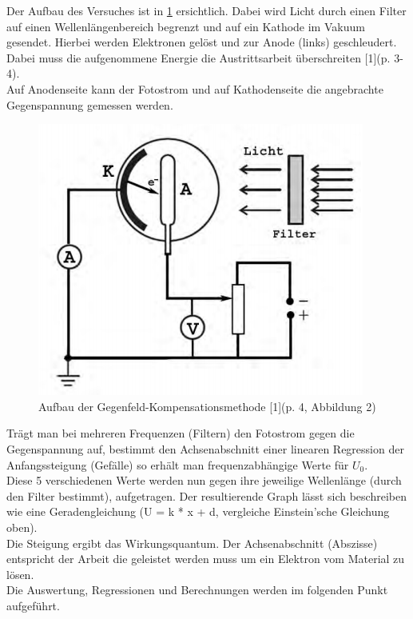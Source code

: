 \documentclass[12pt,a4paper]{article}
\begin{document}
\begin{multicols}{2}
\noindent 
Der Aufbau des Versuches ist in \ref{fig:Plank_Aufbau} ersichtlich. Dabei wird Licht durch einen Filter auf einen Wellenlängenbereich begrenzt und auf ein Kathode im Vakuum gesendet. Hierbei werden Elektronen gelöst und zur Anode (links) geschleudert. Dabei muss die aufgenommene Energie die Austrittsarbeit überschreiten [1](p. 3-4).\\
Auf Anodenseite kann der Fotostrom und auf Kathodenseite die angebrachte Gegenspannung gemessen werden.

\begin{figure}[H]
	\centering
	\includegraphics[scale=0.5]{./data/Planck_Aufbau.png}
	\caption{Aufbau der Gegenfeld-Kompensationsmethode [1](p. 4, Abbildung 2)}
	\label{fig:Plank_Aufbau}
\end{figure}

\noindent 
Trägt man bei mehreren Frequenzen (Filtern) den Fotostrom gegen die Gegenspannung auf, bestimmt den Achsenabschnitt einer linearen Regression der Anfangssteigung (Gefälle) so erhält man frequenzabhängige Werte für $U_0$.\\
Diese 5 verschiedenen Werte werden nun gegen ihre jeweilige Wellenlänge (durch den Filter bestimmt), aufgetragen.
Der resultierende Graph lässt sich beschreiben wie eine Geradengleichung (U = k * x + d, vergleiche Einstein'sche Gleichung oben).\\
Die Steigung ergibt das Wirkungsquantum. Der Achsenabschnitt (Abszisse) entspricht der Arbeit die geleistet werden muss um ein Elektron vom Material zu lösen. \\
Die Auswertung, Regressionen und Berechnungen werden im folgenden Punkt aufgeführt.

\end{multicols}
\end{document}
